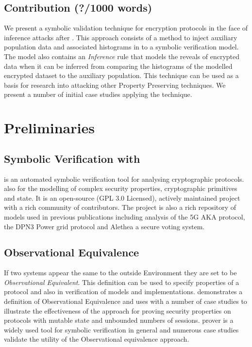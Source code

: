 \documentclass[journal]{IEEEtran}
\begin{document}
\subsection{Contribution (?/1000 words)}
We present a symbolic validation technique for encryption protocols in the face of inference attacks after \cite{InfrenceAttacks}. This approach consists of a method to inject auxiliary population data and associated histograms in to a symbolic verification model. The model also contains an \textit{Inference} rule that models the reveals of encrypted data when it can be inferred from comparing the histograms of the modelled encrypted dataset to the auxiliary population. This technique can be used as a basis for research into attacking other Property Preserving techniques.  We present a number of initial case studies applying the technique.

\section{Preliminaries}

\subsection{Symbolic Verification with \tamarin{}}
\tamarin{}\cite{Meier2013} is an automated symbolic verification tool for analysing cryptographic protocols. \tamarin{} also for the modelling of complex security properties, cryptographic primitives and state. It is an open-source\cite{TamarinGithub} (GPL 3.0 Licensed), actively maintained project with a rich community of contributors. The project is also a rich repository of models used in previous publications including analysis of the 5G AKA protocol\cite{5GAKA}, the DPN3  Power grid protocol\cite{DNP3} and Alethea\cite{Alethea} a secure voting system.

\subsection{Observational Equivalence}
If two systems appear the same to the outside Environment they are set to be \textit{Observational Equivalent}.
This definition can be used to specify properties of a protocol and also in verification of models and implementations. 
\cite{ObsEqvCCS15} demonstrates a definition of Observational Equivalence and uses \tamarin{} with a number of case studies to illustrate the effectiveness of the approach for proving security properties on protocols with mutable state and unbounded numbers of sessions. \tamarin{} \cite{Schmidt2012AutomatedProperties} prover is a widely used\cite{ARPKICCS14, Donenfeld} tool for symbolic verification in general and numerous case studies\cite{Norwegian,5GAKA} validate the utility of the Observational equivalence approach.
\end{document}
